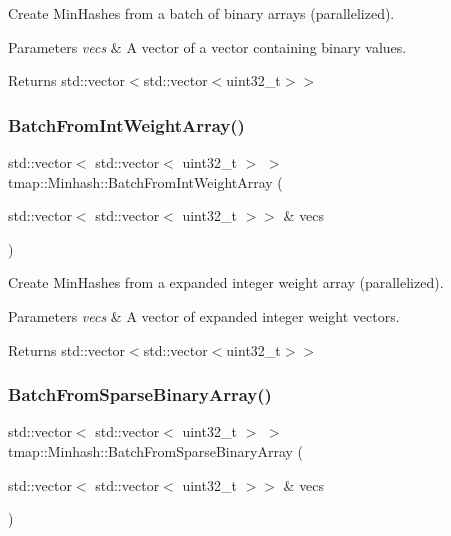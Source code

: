 Create Min\+Hashes from a batch of binary arrays (parallelized). 


\begin{DoxyParams}{Parameters}
{\em vecs} & A vector of a vector containing binary values. \\
\hline
\end{DoxyParams}
\begin{DoxyReturn}{Returns}
std\+::vector$<$std\+::vector$<$uint32\+\_\+t$>$$>$ 
\end{DoxyReturn}
\mbox{\label{classtmap_1_1Minhash_ac0112cf3a99b2e882803a07dc0f0a620}} 
\subsubsection{\texorpdfstring{Batch\+From\+Int\+Weight\+Array()}{BatchFromIntWeightArray()}}
{\footnotesize\ttfamily std\+::vector$<$ std\+::vector$<$ uint32\+\_\+t $>$ $>$ tmap\+::\+Minhash\+::\+Batch\+From\+Int\+Weight\+Array (\begin{DoxyParamCaption}\item[{std\+::vector$<$ std\+::vector$<$ uint32\+\_\+t $>$$>$ \&}]{vecs }\end{DoxyParamCaption})}



Create Min\+Hashes from a expanded integer weight array (parallelized). 


\begin{DoxyParams}{Parameters}
{\em vecs} & A vector of expanded integer weight vectors. \\
\hline
\end{DoxyParams}
\begin{DoxyReturn}{Returns}
std\+::vector$<$std\+::vector$<$uint32\+\_\+t$>$$>$ 
\end{DoxyReturn}
\mbox{\label{classtmap_1_1Minhash_a490cf682e7445393fcf2908d74498ea5}} 
\subsubsection{\texorpdfstring{Batch\+From\+Sparse\+Binary\+Array()}{BatchFromSparseBinaryArray()}}
{\footnotesize\ttfamily std\+::vector$<$ std\+::vector$<$ uint32\+\_\+t $>$ $>$ tmap\+::\+Minhash\+::\+Batch\+From\+Sparse\+Binary\+Array (\begin{DoxyParamCaption}\item[{std\+::vector$<$ std\+::vector$<$ uint32\+\_\+t $>$$>$ \&}]{vecs }\end{DoxyParamCaption})}



